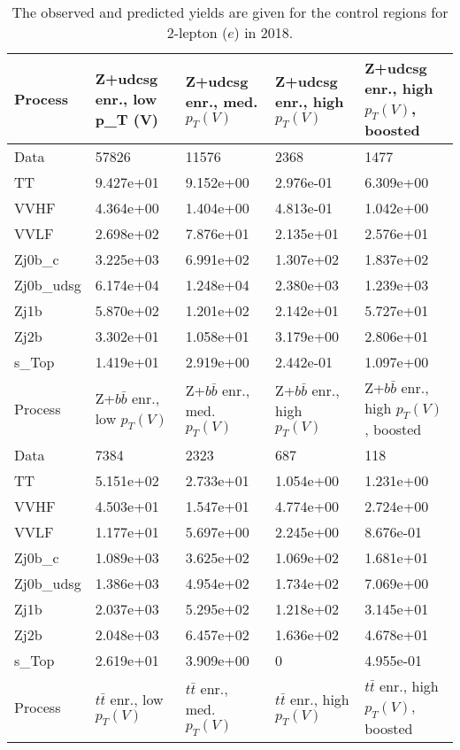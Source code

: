 \begin{table}
\centering
\caption[2018 2-lepton ($e$) control region yields]{
                  The observed and predicted yields are given for the
                  control regions for 2-lepton ($e$) in 2018.
                  }
{\footnotesize
\begin{tabularx}{\textwidth}{|X|X|X|X|X|}
\hline
Process & Z+udcsg enr., low p_{T} (V) & Z+udcsg enr., med. $p_{T}(V)$ & Z+udcsg enr., high $p_{T}(V)$ & Z+udcsg enr., high $p_{T}(V)$, boosted \\
\hline
Data & 57826 & 11576 & 2368 & 1477 \\
\hline
TT & 9.427e+01 & 9.152e+00 & 2.976e-01 & 6.309e+00 \\
VVHF & 4.364e+00 & 1.404e+00 & 4.813e-01 & 1.042e+00 \\
VVLF & 2.698e+02 & 7.876e+01 & 2.135e+01 & 2.576e+01 \\
Zj0b\_c & 3.225e+03 & 6.991e+02 & 1.307e+02 & 1.837e+02 \\
Zj0b\_udsg & 6.174e+04 & 1.248e+04 & 2.380e+03 & 1.239e+03 \\
Zj1b & 5.870e+02 & 1.201e+02 & 2.142e+01 & 5.727e+01 \\
Zj2b & 3.302e+01 & 1.058e+01 & 3.179e+00 & 2.806e+01 \\
s\_Top & 1.419e+01 & 2.919e+00 & 2.442e-01 & 1.097e+00 \\
\hline
\hline
Process & Z+$b\bar{b}$ enr., low $p_{T}(V)$ & Z+$b\bar{b}$ enr., med. $p_{T}(V)$ & Z+$b\bar{b}$ enr., high $p_{T}(V)$ & Z+$b\bar{b}$ enr., high $p_{T}(V)$, boosted \\
\hline
Data & 7384 & 2323 & 687 & 118 \\
\hline
TT & 5.151e+02 & 2.733e+01 & 1.054e+00 & 1.231e+00 \\
VVHF & 4.503e+01 & 1.547e+01 & 4.774e+00 & 2.724e+00 \\
VVLF & 1.177e+01 & 5.697e+00 & 2.245e+00 & 8.676e-01 \\
Zj0b\_c & 1.089e+03 & 3.625e+02 & 1.069e+02 & 1.681e+01 \\
Zj0b\_udsg & 1.386e+03 & 4.954e+02 & 1.734e+02 & 7.069e+00 \\
Zj1b & 2.037e+03 & 5.295e+02 & 1.218e+02 & 3.145e+01 \\
Zj2b & 2.048e+03 & 6.457e+02 & 1.636e+02 & 4.678e+01 \\
s\_Top & 2.619e+01 & 3.909e+00 & 0 & 4.955e-01 \\
\hline
\hline
Process & $t\bar{t}$ enr., low $p_{T}(V)$ & $t\bar{t}$ enr., med. $p_{T}(V)$ & $t\bar{t}$ enr., high $p_{T}(V)$ & $t\bar{t}$ enr., high $p_{T}(V)$, boosted \\

\end{tabularx}}
\end{table}
